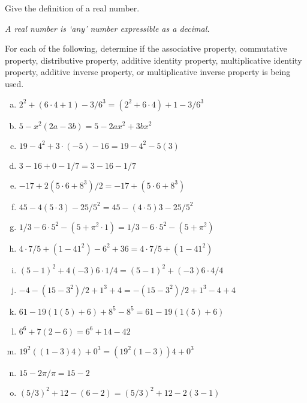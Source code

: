 \documentclass[11pt,letterpaper]{article}
\begin{document}

 Give the definition of a real number. \pvspace{1cm}

{\itshape A real number is `any' number expressible as a decimal.}



\vfill



 For each of the following, determine if the associative property, commutative property, distributive property, additive identity property, multiplicative identity property, additive inverse property, or multiplicative inverse property is being used. \pvspace{0.2cm}

\begin{enumerate}[(a)] \itemsep=2ex
        \item {} \qquad $2^2 + (6 \cdot 4 + 1) - 3/6^3 = (2^2 + 6 \cdot 4) + 1 - 3/6^3$
        \item {} \qquad $5 - x^2 (2a - 3b) = 5- 2ax^2 + 3bx^2$
        \item {} \qquad $19 - 4^2 + 3 \cdot (-5) - 16 = 19 - 4^2 - 5 (3)$
        \item {} \qquad $3 - 16 + 0 -1/7 = 3 - 16 - 1/7$
        \item {} \qquad $-17 + 2(5 \cdot 6 + 8^3)/2 = -17 + (5 \cdot 6 + 8^3)$
        \item {} \qquad $45 - 4(5 \cdot 3) - 25/5^2 = 45 - (4 \cdot 5)3 - 25/5^2$
        \item {} \qquad $1/3 - 6 \cdot 5^2 - (5 + \pi^2 \cdot 1) = 1/3 - 6 \cdot 5^2 - (5 + \pi^2)$
        \item {} \qquad $4 \cdot 7/5 + (1 - 41^2) - 6^2 + 36 = 4 \cdot 7/5 + (1 - 41^2)$
        \item {} \qquad $(5 - 1)^2 + 4(-3)6 \cdot 1/4 = (5 - 1)^2 + (-3)6 \cdot 4/4$
        \item {} \qquad $-4 - (15 - 3^2)/2 + 1^3 + 4 = - (15 - 3^2)/2 + 1^3 - 4 + 4$
        \item {} \qquad $61 - 19( 1(5) + 6) + 8^5 - 8^5 = 61 - 19( 1(5) + 6)$
        \item {} \qquad $6^6 + 7(2 - 6) = 6^6 + 14 - 42$
        \item {} \qquad $19^2 ((1 - 3)4) + 0^3 = (19^2 (1 - 3))4 + 0^3$
        \item {} \qquad $15 - 2\pi/\pi = 15 - 2$
        \item {} \qquad $(5/3)^2 + 12 - (6 - 2) = (5/3)^2 + 12 - 2(3 - 1)$
        \end{enumerate}
\end{document}
